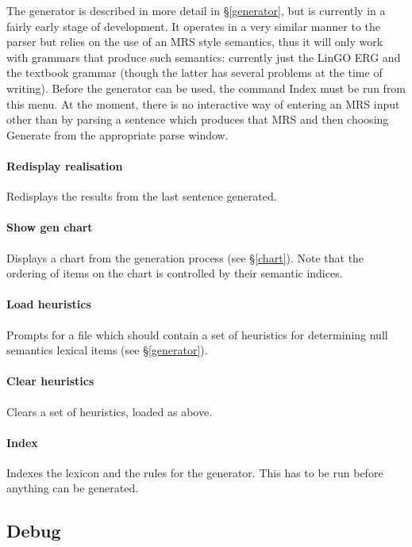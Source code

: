\documentclass[12pt]{report}
\newcommand{\lkbmenucommand}{{\bf}}
\begin{document}
The generator is described in more detail in \S\ref{generator},
but is currently in a fairly early stage of development.
It operates in a very similar manner to the parser
but relies on the use of an MRS style semantics,
thus it will only work with grammars that produce 
such semantics: currently just the LinGO ERG
and the textbook grammar (though the latter has several problems at
the time of writing).
Before the generator can be used,
the command {\lkbmenucommand Index} must be run from this menu.
At the moment,
there is no interactive way of entering an MRS input other than by parsing
a sentence which produces that MRS and then choosing
{\lkbmenucommand Generate} from the appropriate parse window.

\paragraph{Redisplay realisation}
Redisplays the results from the last sentence generated.

\paragraph{Show gen chart}
Displays a chart from the generation process (see \S\ref{chart}).  Note that 
the ordering of items on the chart is controlled by their semantic
indices.  

\paragraph{Load heuristics}

Prompts for a file which should contain a set of heuristics for
determining null semantics lexical items (see \S\ref{generator}).

\paragraph{Clear heuristics}

Clears a set of heuristics, loaded as above.

\paragraph{Index}
Indexes the lexicon and the rules for the generator.  This has to
be run before anything can be generated.


\subsection{Debug}
\label{debug}
\end{document}
